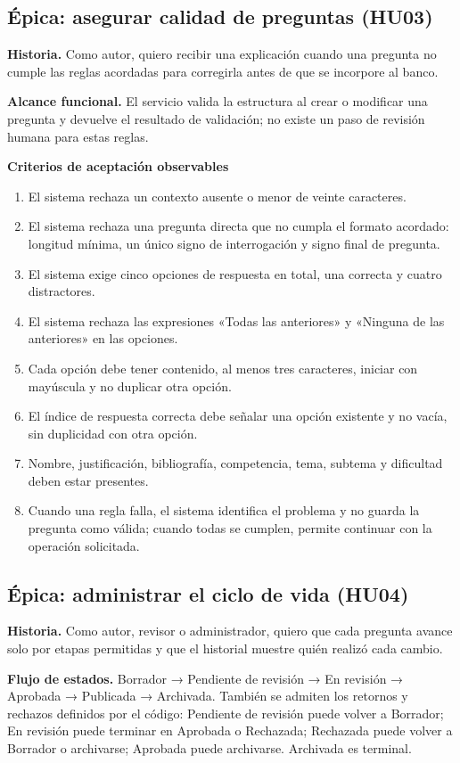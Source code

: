 \documentclass[12pt,a4paper]{article}
\begin{document}
\subsection{Épica: asegurar calidad de preguntas (HU03)}
\textbf{Historia.} Como autor, quiero recibir una explicación cuando una pregunta no cumple las reglas acordadas para corregirla antes de que se incorpore al banco.

\textbf{Alcance funcional.} El servicio valida la estructura al crear o modificar una pregunta y devuelve el resultado de validación; no existe un paso de revisión humana para estas reglas.

\textbf{Criterios de aceptación observables}
\begin{enumerate}[leftmargin=*]
\item El sistema rechaza un contexto ausente o menor de veinte caracteres.
\item El sistema rechaza una pregunta directa que no cumpla el formato acordado: longitud mínima, un único signo de interrogación y signo final de pregunta.
\item El sistema exige cinco opciones de respuesta en total, una correcta y cuatro distractores.
\item El sistema rechaza las expresiones «Todas las anteriores» y «Ninguna de las anteriores» en las opciones.
\item Cada opción debe tener contenido, al menos tres caracteres, iniciar con mayúscula y no duplicar otra opción.
\item El índice de respuesta correcta debe señalar una opción existente y no vacía, sin duplicidad con otra opción.
\item Nombre, justificación, bibliografía, competencia, tema, subtema y dificultad deben estar presentes.
\item Cuando una regla falla, el sistema identifica el problema y no guarda la pregunta como válida; cuando todas se cumplen, permite continuar con la operación solicitada.
\end{enumerate}

\subsection{Épica: administrar el ciclo de vida (HU04)}
\textbf{Historia.} Como autor, revisor o administrador, quiero que cada pregunta avance solo por etapas permitidas y que el historial muestre quién realizó cada cambio.

\textbf{Flujo de estados.} Borrador → Pendiente de revisión → En revisión → Aprobada → Publicada → Archivada. También se admiten los retornos y rechazos definidos por el código: Pendiente de revisión puede volver a Borrador; En revisión puede terminar en Aprobada o Rechazada; Rechazada puede volver a Borrador o archivarse; Aprobada puede archivarse. Archivada es terminal.
\end{document}
